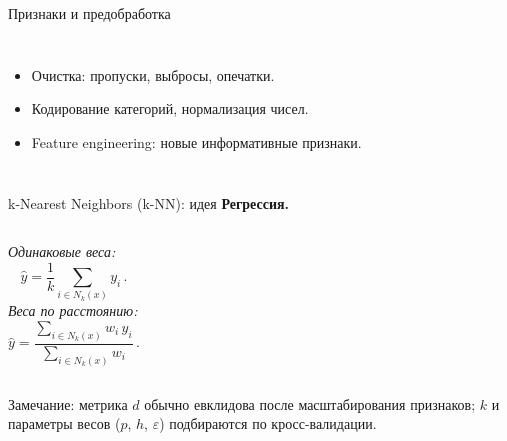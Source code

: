 \documentclass[11pt,aspectratio=169]{beamer}
\begin{document}
\begin{frame}{Признаки и предобработка}
	\begin{columns}
		\begin{itemize}
			\item Очистка: пропуски, выбросы, опечатки.
			\item Кодирование категорий, нормализация чисел.
			\item Feature engineering: новые информативные признаки.
		\end{itemize}
	\end{columns}
\end{frame}
\begin{frame}{k-Nearest Neighbors (k-NN): идея}
	\textbf{Регрессия.}
	\begin{columns}[T,onlytextwidth]
		\column{0.48\textwidth}
		\textit{Одинаковые веса:}
		\[
			\hat y = \frac{1}{k} \sum_{i\in N_k(x)} y_i \, .
		\]
		\column{0.52\textwidth}
		\textit{Веса по расстоянию:}
		\[
			\hat y = \frac{\sum_{i\in N_k(x)} w_i\, y_i}{\sum_{i\in N_k(x)} w_i} \, .
		\]
	\end{columns}
	\footnotesize Замечание: метрика $d$ обычно евклидова после масштабирования признаков; $k$ и параметры весов ($p$, $h$, $\varepsilon$) подбираются по кросс-валидации.
\end{frame}
\end{document}
